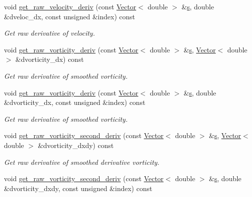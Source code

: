 \begin{DoxyCompactItemize}
void \hyperlink{classoomph_1_1VorticitySmootherElement_ae62b043f15684347e021de18ad10060b}{get\+\_\+raw\+\_\+velocity\+\_\+deriv} (const \hyperlink{classoomph_1_1Vector}{Vector}$<$ double $>$ \&\hyperlink{cfortran_8h_ab7123126e4885ef647dd9c6e3807a21c}{s}, double \&dveloc\+\_\+dx, const unsigned \&index) const
\begin{DoxyCompactList}\small\item\em Get raw derivative of velocity. \end{DoxyCompactList}\item 
void \hyperlink{classoomph_1_1VorticitySmootherElement_ab2eca05bdab5e65e235f2935bd62815c}{get\+\_\+raw\+\_\+vorticity\+\_\+deriv} (const \hyperlink{classoomph_1_1Vector}{Vector}$<$ double $>$ \&\hyperlink{cfortran_8h_ab7123126e4885ef647dd9c6e3807a21c}{s}, \hyperlink{classoomph_1_1Vector}{Vector}$<$ double $>$ \&dvorticity\+\_\+dx) const
\begin{DoxyCompactList}\small\item\em Get raw derivative of smoothed vorticity. \end{DoxyCompactList}\item 
void \hyperlink{classoomph_1_1VorticitySmootherElement_ab070bf8233fe89a359e3c93a4ab1708c}{get\+\_\+raw\+\_\+vorticity\+\_\+deriv} (const \hyperlink{classoomph_1_1Vector}{Vector}$<$ double $>$ \&\hyperlink{cfortran_8h_ab7123126e4885ef647dd9c6e3807a21c}{s}, double \&dvorticity\+\_\+dx, const unsigned \&index) const
\begin{DoxyCompactList}\small\item\em Get raw derivative of smoothed vorticity. \end{DoxyCompactList}\item 
void \hyperlink{classoomph_1_1VorticitySmootherElement_aea5adb8174d61cce321050a83bb10124}{get\+\_\+raw\+\_\+vorticity\+\_\+second\+\_\+deriv} (const \hyperlink{classoomph_1_1Vector}{Vector}$<$ double $>$ \&\hyperlink{cfortran_8h_ab7123126e4885ef647dd9c6e3807a21c}{s}, \hyperlink{classoomph_1_1Vector}{Vector}$<$ double $>$ \&dvorticity\+\_\+dxdy) const
\begin{DoxyCompactList}\small\item\em Get raw derivative of smoothed derivative vorticity. \end{DoxyCompactList}\item 
void \hyperlink{classoomph_1_1VorticitySmootherElement_a3d40fe93a1215c08f8524c1ff2b6e193}{get\+\_\+raw\+\_\+vorticity\+\_\+second\+\_\+deriv} (const \hyperlink{classoomph_1_1Vector}{Vector}$<$ double $>$ \&\hyperlink{cfortran_8h_ab7123126e4885ef647dd9c6e3807a21c}{s}, double \&dvorticity\+\_\+dxdy, const unsigned \&index) const

\end{DoxyCompactItemize}
